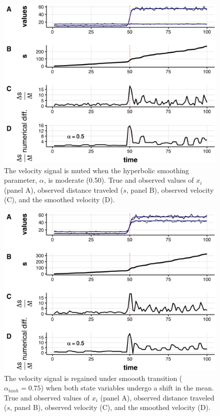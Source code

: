 \documentclass[print]{nuthesis}
\begin{document}
\newpage
\begin{figure}
\includegraphics[width=0.85\linewidth]{./chapterFiles/velocity/figsCalledInDiss/changeMuX1_tanhAlpha1-05tvdiffAlpha-1000iter_stackTvdiff} \caption{The velocity signal is muted when the  hyperbolic smoothing parameter, $\alpha$, is moderate (0.50). True and observed values of $x_i$ (panel A), observed distance traveled ($s$, panel B), observed velocity (C), and the smoothed velocity (D). }\label{fig:mu1var1}
\end{figure}
\newpage
\begin{figure}
\includegraphics[width=0.85\linewidth]{./chapterFiles/velocity/figsCalledInDiss/changeMuBoth_tanhAlpha075-05tvdiffAlpha-1000iter_stackTvdiff} \caption{The velocity signal is regained under smoooth transition ($\alpha_{tanh}=0.75$) when both state variables undergo a shift in the mean. True and observed values of $x_i$ (panel A), observed distance traveled ($s$, panel B), observed velocity (C), and the smoothed velocity (D). }\label{fig:muBoth75}
\end{figure}
\end{document}
